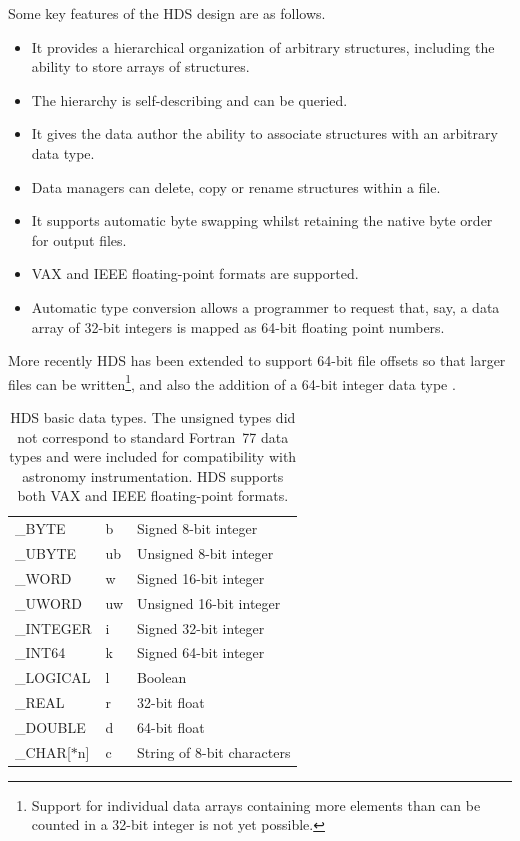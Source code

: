 \documentclass[final,authoryear,5p,times,twocolumn]{elsarticle}
\begin{document}
Some key features of the HDS design are as follows.
\begin{itemize}
\item It provides a hierarchical organization of arbitrary structures, including the
  ability to store arrays of structures.
\item The hierarchy is self-describing and can be queried.
\item It gives the data author the ability to associate structures with an arbitrary data type.
\item Data managers can delete, copy or rename structures within a file.
\item It supports automatic byte swapping whilst retaining the native byte order
  for output files.
\item VAX and IEEE floating-point formats are supported.
\item Automatic type conversion allows a programmer to request that,
  say, a data array of 32-bit integers is mapped as 64-bit floating
  point numbers.
\end{itemize}

More recently HDS has been extended to support 64-bit file offsets so
that larger files can be written\footnote{Support for individual data
arrays containing more elements than can be counted in a 32-bit
integer is not yet possible.}, and also the
addition of a 64-bit integer data type \citep{P82_adassxxiii}.

\begin{table}
\caption{HDS basic data types. The unsigned types did not correspond
  to standard Fortran~77 data types and were included for
  compatibility with astronomy instrumentation. HDS supports both VAX
  and IEEE floating-point formats.}
\label{tab:hdstypes}
\begin{center}
\begin{tabular}{lll}
\hline
\_BYTE & b & Signed 8-bit integer \\
\_UBYTE & ub & Unsigned 8-bit integer \\
\_WORD & w & Signed 16-bit integer \\
\_UWORD & uw & Unsigned 16-bit integer \\
\_INTEGER & i & Signed 32-bit integer \\
\_INT64 & k &Signed 64-bit integer \\
\_LOGICAL & l & Boolean \\
\_REAL & r & 32-bit float \\
\_DOUBLE & d & 64-bit float \\
\_CHAR[$*$n] & c & String of 8-bit characters \\
\hline
\end{tabular}
\end{center}
\end{table}
\end{document}
